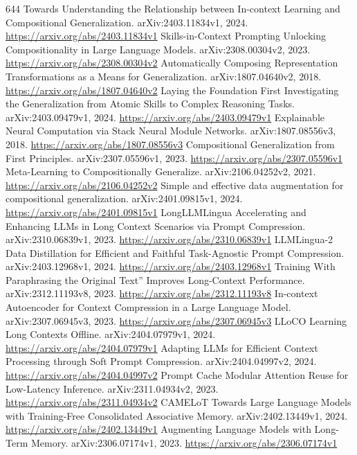 \documentclass[11pt]{article}
\begin{document}
\begin{thebibliography}{644}
 Towards Understanding the Relationship between In-context Learning and Compositional Generalization. arXiv:2403.11834v1, 2024. \url{https://arxiv.org/abs/2403.11834v1}
 Skills-in-Context Prompting Unlocking Compositionality in Large Language Models. arXiv:2308.00304v2, 2023. \url{https://arxiv.org/abs/2308.00304v2}
 Automatically Composing Representation Transformations as a Means for Generalization. arXiv:1807.04640v2, 2018. \url{https://arxiv.org/abs/1807.04640v2}
 Laying the Foundation First Investigating the Generalization from Atomic Skills to Complex Reasoning Tasks. arXiv:2403.09479v1, 2024. \url{https://arxiv.org/abs/2403.09479v1}
 Explainable Neural Computation via Stack Neural Module Networks. arXiv:1807.08556v3, 2018. \url{https://arxiv.org/abs/1807.08556v3}
 Compositional Generalization from First Principles. arXiv:2307.05596v1, 2023. \url{https://arxiv.org/abs/2307.05596v1}
 Meta-Learning to Compositionally Generalize. arXiv:2106.04252v2, 2021. \url{https://arxiv.org/abs/2106.04252v2}
 Simple and effective data augmentation for compositional generalization. arXiv:2401.09815v1, 2024. \url{https://arxiv.org/abs/2401.09815v1}
 LongLLMLingua Accelerating and Enhancing LLMs in Long Context Scenarios via Prompt Compression. arXiv:2310.06839v1, 2023. \url{https://arxiv.org/abs/2310.06839v1}
 LLMLingua-2 Data Distillation for Efficient and Faithful Task-Agnostic Prompt Compression. arXiv:2403.12968v1, 2024. \url{https://arxiv.org/abs/2403.12968v1}
 Training With Paraphrasing the Original Text'' Improves Long-Context Performance. arXiv:2312.11193v8, 2023. \url{https://arxiv.org/abs/2312.11193v8}
 In-context Autoencoder for Context Compression in a Large Language Model. arXiv:2307.06945v3, 2023. \url{https://arxiv.org/abs/2307.06945v3}
 LLoCO Learning Long Contexts Offline. arXiv:2404.07979v1, 2024. \url{https://arxiv.org/abs/2404.07979v1}
 Adapting LLMs for Efficient Context Processing through Soft Prompt Compression. arXiv:2404.04997v2, 2024. \url{https://arxiv.org/abs/2404.04997v2}
 Prompt Cache Modular Attention Reuse for Low-Latency Inference. arXiv:2311.04934v2, 2023. \url{https://arxiv.org/abs/2311.04934v2}
 CAMELoT Towards Large Language Models with Training-Free Consolidated Associative Memory. arXiv:2402.13449v1, 2024. \url{https://arxiv.org/abs/2402.13449v1}
 Augmenting Language Models with Long-Term Memory. arXiv:2306.07174v1, 2023. \url{https://arxiv.org/abs/2306.07174v1}

\end{thebibliography}
\end{document}
